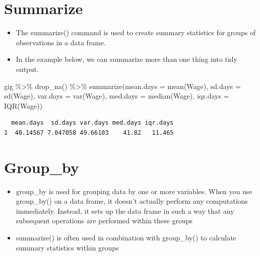 \documentclass[
  letterpaper,
  DIV=11,
  numbers=noendperiod]{scrreprt}
\newenvironment{Shaded}{\begin{snugshade}}{\end{snugshade}}
\newcommand{\AttributeTok}[1]{\textcolor[rgb]{0.40,0.45,0.13}{#1}}
\newcommand{\FunctionTok}[1]{\textcolor[rgb]{0.28,0.35,0.67}{#1}}
\newcommand{\NormalTok}[1]{\textcolor[rgb]{0.00,0.23,0.31}{#1}}
\newcommand{\SpecialCharTok}[1]{\textcolor[rgb]{0.37,0.37,0.37}{#1}}
\providecommand{\tightlist}{%
  \setlength{\itemsep}{0pt}\setlength{\parskip}{0pt}}\usepackage{longtable,booktabs,array}
\begin{document}

\chapter{Summarize}\label{summarize}

\begin{itemize}
\tightlist
\item
  The summarize() command is used to create summary statistics for
  groups of observations in a data frame.
\item
  In the example below, we can summarize more than one thing into tidy
  output.
\end{itemize}

\begin{Shaded}
\begin{Highlighting}[]
\NormalTok{gig }\SpecialCharTok{\%\textgreater{}\%}
    \FunctionTok{drop\_na}\NormalTok{() }\SpecialCharTok{\%\textgreater{}\%}
    \FunctionTok{summarize}\NormalTok{(}\AttributeTok{mean.days =} \FunctionTok{mean}\NormalTok{(Wage), }\AttributeTok{sd.days =} \FunctionTok{sd}\NormalTok{(Wage), }\AttributeTok{var.days =} \FunctionTok{var}\NormalTok{(Wage),}
        \AttributeTok{med.days =} \FunctionTok{median}\NormalTok{(Wage), }\AttributeTok{iqr.days =} \FunctionTok{IQR}\NormalTok{(Wage))}
\end{Highlighting}
\end{Shaded}

\begin{verbatim}
  mean.days  sd.days var.days med.days iqr.days
1  40.14567 7.047058 49.66103    41.82   11.465
\end{verbatim}


\chapter{Group\_by}\label{group_by}

\begin{itemize}
\tightlist
\item
  group\_by is used for grouping data by one or more variables. When you
  use group\_by() on a data frame, it doesn't actually perform any
  computations immediately. Instead, it sets up the data frame in such a
  way that any subsequent operations are performed within these groups
\item
  summarize() is often used in combination with group\_by() to calculate
  summary statistics within groups
\end{itemize}
\end{document}
